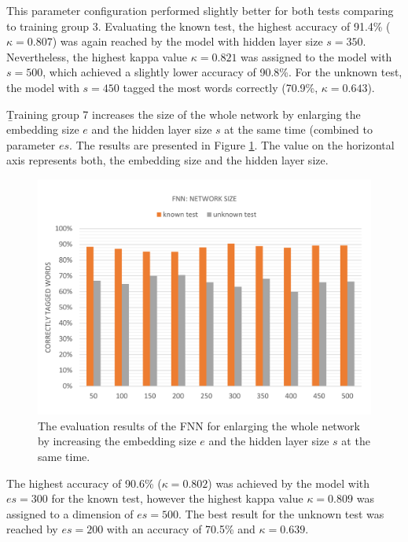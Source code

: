 This parameter configuration performed slightly better for both tests comparing to training group 3. Evaluating the known test, the highest accuracy of 91.4\% ($\kappa=0.807$) was again reached by the model with hidden layer size $s=350$. Nevertheless, the highest kappa value $\kappa=0.821$ was assigned to the model with $s=500$, which achieved a slightly lower accuracy of 90.8\%. For the unknown test, the model with $s=450$ tagged the most words correctly (70.9\%, $\kappa=0.643$).

\b{Training group 7} increases the size of the whole network by enlarging the embedding size $e$ and the hidden layer size $s$ at the same time (combined to parameter $es$. The results are presented in Figure \ref{f.evaluation.fnn.es}. The value on the horizontal axis represents both, the embedding size and the hidden layer size.

\begin{figure}[H]
	\hspace{-5mm}\includegraphics[width=1.07\textwidth]{images/evaluation_fnn_es}
	\caption[FNN Evaluation: Network Size]{The evaluation results of the FNN for enlarging the whole network by increasing the embedding size $e$ and the hidden layer size $s$ at the same time.}
	\label{f.evaluation.fnn.es}
\end{figure}

The highest accuracy of 90.6\% ($\kappa=0.802$) was achieved by the model with $es=300$ for the known test, however the highest kappa value $\kappa=0.809$ was assigned to a dimension of $es=500$. The best result for the unknown test was reached by $es=200$ with an accuracy of 70.5\% and $\kappa=0.639$.

